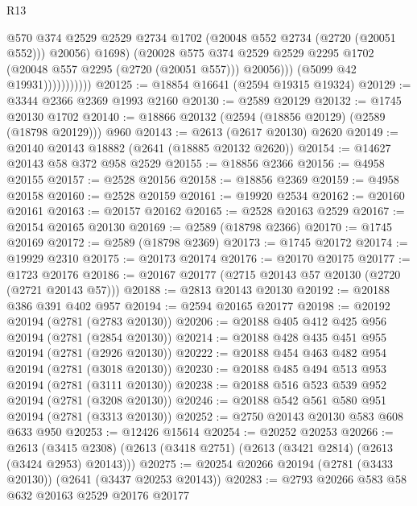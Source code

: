\begin{lexlean}{R13}
\begin{coremodule}
                                @570
                                @374
                                @2529
                                @2529
                                @2734
                                @1702
                                (@20048 @552 @2734 (@2720 (@20051 @552)))
                                @20056)
                              @1698)
                            (@20028
                              @575
                              @374
                              @2529
                              @2529
                              @2295
                              @1702
                              (@20048 @557 @2295 (@2720 (@20051 @557)))
                              @20056)))
                        (@5099 @42 @19931)))))))))))
@20125 := @18854 @16641 (@2594 @19315 @19324)
@20129 := @3344 @2366 @2369 @1993 @2160
@20130 := @2589 @20129
@20132 := @1745 @20130 @1702
@20140 := @18866 @20132 (@2594 (@18856 @20129) (@2589 (@18798 @20129))) @960
@20143 := @2613 (@2617 @20130) @2620
@20149 := @20140 @20143 @18882 (@2641 (@18885 @20132 @2620))
@20154 := @14627 @20143 @58 @372 @958 @2529
@20155 := @18856 @2366
@20156 := @4958 @20155
@20157 := @2528 @20156
@20158 := @18856 @2369
@20159 := @4958 @20158
@20160 := @2528 @20159
@20161 := @19920 @2534
@20162 := @20160 @20161
@20163 := @20157 @20162
@20165 := @2528 @20163 @2529
@20167 := @20154 @20165 @20130
@20169 := @2589 (@18798 @2366)
@20170 := @1745 @20169
@20172 := @2589 (@18798 @2369)
@20173 := @1745 @20172
@20174 := @19929 @2310
@20175 := @20173 @20174
@20176 := @20170 @20175
@20177 := @1723 @20176
@20186 := @20167 @20177 (@2715 @20143 @57 @20130 (@2720 (@2721 @20143 @57)))
@20188 := @2813 @20143 @20130
@20192 := @20188 @386 @391 @402 @957
@20194 := @2594 @20165 @20177
@20198 := @20192 @20194 (@2781 (@2783 @20130))
@20206 := @20188 @405 @412 @425 @956 @20194 (@2781 (@2854 @20130))
@20214 := @20188 @428 @435 @451 @955 @20194 (@2781 (@2926 @20130))
@20222 := @20188 @454 @463 @482 @954 @20194 (@2781 (@3018 @20130))
@20230 := @20188 @485 @494 @513 @953 @20194 (@2781 (@3111 @20130))
@20238 := @20188 @516 @523 @539 @952 @20194 (@2781 (@3208 @20130))
@20246 := @20188 @542 @561 @580 @951 @20194 (@2781 (@3313 @20130))
@20252 := @2750 @20143 @20130 @583 @608 @633 @950
@20253 := @12426 @15614
@20254 := @20252 @20253
@20266 := @2613
    (@3415 @2308)
    (@2613 (@3418 @2751) (@2613 (@3421 @2814) (@2613 (@3424 @2953) @20143)))
@20275 := @20254 @20266 @20194 (@2781 (@3433 @20130)) (@2641 (@3437 @20253 @20143))
@20283 := @2793 @20266 @583 @58 @632 @20163 @2529 @20176 @20177

\end{coremodule}
\end{lexlean}
